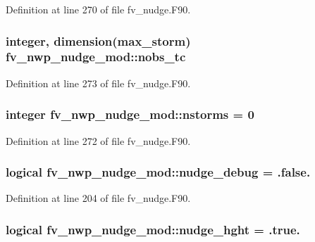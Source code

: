 Definition at line 270 of file fv\-\_\-nudge.\-F90.

\subsubsection[{nobs\-\_\-tc}]{\setlength{\rightskip}{0pt plus 5cm}integer, dimension({\bf max\-\_\-storm}) fv\-\_\-nwp\-\_\-nudge\-\_\-mod\-::nobs\-\_\-tc\hspace{0.3cm}{\ttfamily [private]}}\label{classfv__nwp__nudge__mod_a5c2925d3d3fb1e24385718a9533b8092}


Definition at line 273 of file fv\-\_\-nudge.\-F90.

\subsubsection[{nstorms}]{\setlength{\rightskip}{0pt plus 5cm}integer fv\-\_\-nwp\-\_\-nudge\-\_\-mod\-::nstorms = 0\hspace{0.3cm}{\ttfamily [private]}}\label{classfv__nwp__nudge__mod_a9c3ad6de2a20927fcd7f0b6433599038}


Definition at line 272 of file fv\-\_\-nudge.\-F90.

\subsubsection[{nudge\-\_\-debug}]{\setlength{\rightskip}{0pt plus 5cm}logical fv\-\_\-nwp\-\_\-nudge\-\_\-mod\-::nudge\-\_\-debug = .false.\hspace{0.3cm}{\ttfamily [private]}}\label{classfv__nwp__nudge__mod_aa949ba1a2ce2ca23017b0da8a43f6c53}


Definition at line 204 of file fv\-\_\-nudge.\-F90.

\subsubsection[{nudge\-\_\-hght}]{\setlength{\rightskip}{0pt plus 5cm}logical fv\-\_\-nwp\-\_\-nudge\-\_\-mod\-::nudge\-\_\-hght = .true.\hspace{0.3cm}{\ttfamily [private]}}\label{classfv__nwp__nudge__mod_a6e98d55e79bcefff8ef5c6db06c5aa6a}


